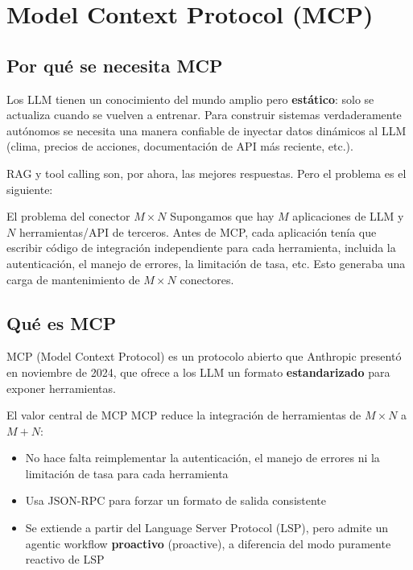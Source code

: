 \section{Model Context Protocol (MCP)}

\subsection{Por qué se necesita MCP}

Los LLM tienen un conocimiento del mundo amplio pero \textbf{estático}: solo se actualiza cuando se vuelven a entrenar. Para construir sistemas verdaderamente autónomos se necesita una manera confiable de inyectar datos dinámicos al LLM (clima, precios de acciones, documentación de API más reciente, etc.).

RAG y tool calling son, por ahora, las mejores respuestas. Pero el problema es el siguiente:

\begin{knowledgebox}{El problema del conector $M \times N$}
Supongamos que hay $M$ aplicaciones de LLM y $N$ herramientas/API de terceros. Antes de MCP, cada aplicación tenía que escribir código de integración independiente para cada herramienta, incluida la autenticación, el manejo de errores, la limitación de tasa, etc. Esto generaba una carga de mantenimiento de $M \times N$ conectores.
\end{knowledgebox}

\subsection{Qué es MCP}

MCP (Model Context Protocol) es un protocolo abierto que Anthropic presentó en noviembre de 2024, que ofrece a los LLM un formato \textbf{estandarizado} para exponer herramientas.

\begin{importantbox}{El valor central de MCP}
MCP reduce la integración de herramientas de $M \times N$ a $M + N$:
\begin{itemize}
    \item No hace falta reimplementar la autenticación, el manejo de errores ni la limitación de tasa para cada herramienta
    \item Usa JSON-RPC para forzar un formato de salida consistente
    \item Se extiende a partir del Language Server Protocol (LSP), pero admite un agentic workflow \textbf{proactivo} (proactive), a diferencia del modo puramente reactivo de LSP
\end{itemize}
\end{importantbox}

